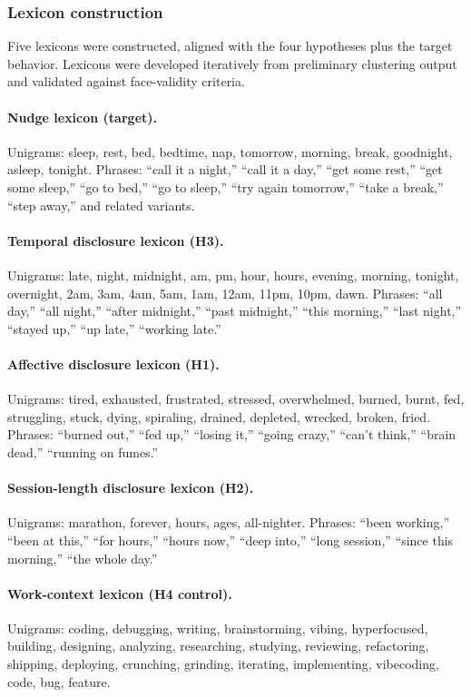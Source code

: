 \documentclass[11pt]{article}
\begin{document}
\subsubsection{Lexicon construction}

Five lexicons were constructed, aligned with the four hypotheses plus the target behavior. Lexicons were developed iteratively from preliminary clustering output and validated against face-validity criteria.

\paragraph{Nudge lexicon (target).} Unigrams: sleep, rest, bed, bedtime, nap, tomorrow, morning, break, goodnight, asleep, tonight. Phrases: ``call it a night,'' ``call it a day,'' ``get some rest,'' ``get some sleep,'' ``go to bed,'' ``go to sleep,'' ``try again tomorrow,'' ``take a break,'' ``step away,'' and related variants.

\paragraph{Temporal disclosure lexicon (H3).} Unigrams: late, night, midnight, am, pm, hour, hours, evening, morning, tonight, overnight, 2am, 3am, 4am, 5am, 1am, 12am, 11pm, 10pm, dawn. Phrases: ``all day,'' ``all night,'' ``after midnight,'' ``past midnight,'' ``this morning,'' ``last night,'' ``stayed up,'' ``up late,'' ``working late.''

\paragraph{Affective disclosure lexicon (H1).} Unigrams: tired, exhausted, frustrated, stressed, overwhelmed, burned, burnt, fed, struggling, stuck, dying, spiraling, drained, depleted, wrecked, broken, fried. Phrases: ``burned out,'' ``fed up,'' ``losing it,'' ``going crazy,'' ``can't think,'' ``brain dead,'' ``running on fumes.''

\paragraph{Session-length disclosure lexicon (H2).} Unigrams: marathon, forever, hours, ages, all-nighter. Phrases: ``been working,'' ``been at this,'' ``for hours,'' ``hours now,'' ``deep into,'' ``long session,'' ``since this morning,'' ``the whole day.''

\paragraph{Work-context lexicon (H4 control).} Unigrams: coding, debugging, writing, brainstorming, vibing, hyperfocused, building, designing, analyzing, researching, studying, reviewing, refactoring, shipping, deploying, crunching, grinding, iterating, implementing, vibecoding, code, bug, feature.
\end{document}
